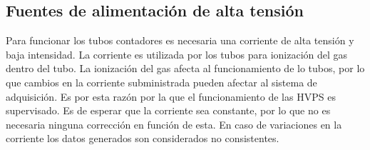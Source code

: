 	\subsection{Fuentes de alimentación de alta tensión}
		Para funcionar los tubos contadores es necesaria una corriente de alta tensión y baja intensidad. La corriente es utilizada por los tubos
		para ionización del gas dentro del tubo. La ionización del gas afecta al funcionamiento de lo tubos, por lo que cambios en la corriente
		subministrada pueden afectar al sistema de adquisición. Es por esta razón por la que el funcionamiento de las HVPS es supervisado. Es de esperar
		que la corriente sea constante, por lo que no es necesaria ninguna corrección en función de esta. En caso de variaciones en la corriente los datos
		generados son considerados no consistentes.

